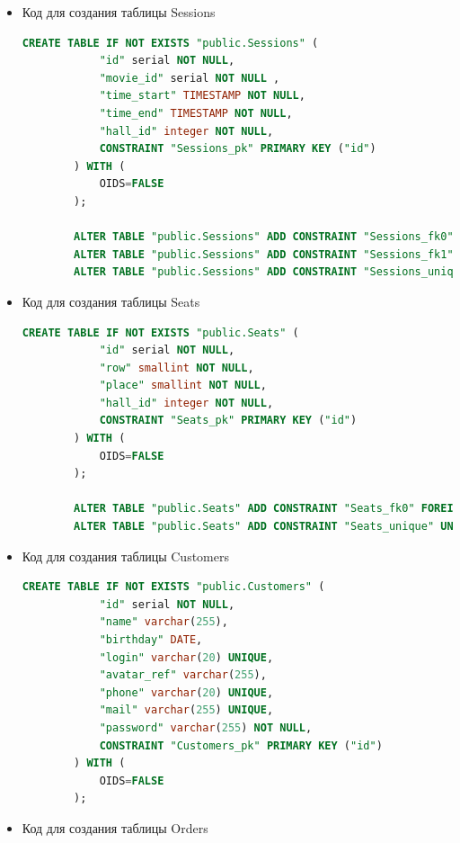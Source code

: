 \documentclass[a4paper,12pt]{article}
\renewcommand{\^}[2]{#1^{\, #2} \kern -1pt}
\newcommand{\1}{\kern 1pt}
\newcommand{\0}{\kern -1pt}
\begin{document}
\begin{itemize}
	\item Код для создания таблицы Sessions

	\begin{lstlisting}[style=vscode-dark, language=SQL, label={lst:sql12}]
		CREATE TABLE IF NOT EXISTS "public.Sessions" (
			"id" serial NOT NULL,
			"movie_id" serial NOT NULL ,
			"time_start" TIMESTAMP NOT NULL,
			"time_end" TIMESTAMP NOT NULL,
			"hall_id" integer NOT NULL,
			CONSTRAINT "Sessions_pk" PRIMARY KEY ("id")
		) WITH (
			OIDS=FALSE
		);
		
		ALTER TABLE "public.Sessions" ADD CONSTRAINT "Sessions_fk0" FOREIGN KEY ("movie_id") REFERENCES "public.Movies"("id");
		ALTER TABLE "public.Sessions" ADD CONSTRAINT "Sessions_fk1" FOREIGN KEY ("hall_id") REFERENCES "public.Halls"("id");
		ALTER TABLE "public.Sessions" ADD CONSTRAINT "Sessions_unique" UNIQUE("hall_id", "time_start");
	\end{lstlisting}
	
	\item Код для создания таблицы Seats
	
	\begin{lstlisting}[style=vscode-dark, language=SQL, label={lst:sql13}]
		CREATE TABLE IF NOT EXISTS "public.Seats" (
			"id" serial NOT NULL,
			"row" smallint NOT NULL,
			"place" smallint NOT NULL,
			"hall_id" integer NOT NULL,
			CONSTRAINT "Seats_pk" PRIMARY KEY ("id")
		) WITH (
			OIDS=FALSE
		);
		
		ALTER TABLE "public.Seats" ADD CONSTRAINT "Seats_fk0" FOREIGN KEY ("hall_id") REFERENCES "public.Halls"("id");
		ALTER TABLE "public.Seats" ADD CONSTRAINT "Seats_unique" UNIQUE("row", "place", "hall_id");
	\end{lstlisting}

	\item Код для создания таблицы Customers

	\begin{lstlisting}[style=vscode-dark, language=SQL, label={lst:sql14}]
		CREATE TABLE IF NOT EXISTS "public.Customers" (
			"id" serial NOT NULL,
			"name" varchar(255),
			"birthday" DATE,
			"login" varchar(20) UNIQUE,
			"avatar_ref" varchar(255),
			"phone" varchar(20) UNIQUE,
			"mail" varchar(255) UNIQUE,
			"password" varchar(255) NOT NULL,
			CONSTRAINT "Customers_pk" PRIMARY KEY ("id")
		) WITH (
			OIDS=FALSE
		);
	\end{lstlisting}

	\item Код для создания таблицы Orders


\end{itemize}
\end{document}

